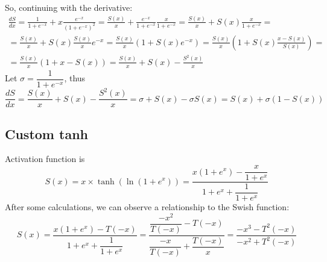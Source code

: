 So, continuing with the derivative:
\[
\begin{gathered}
\frac{dS}{dx} = \frac{1}{1+e^{-x}} + x \frac{e^{-x}}{\left( 1 + e^{-x} \right)^2} = \frac{S(x)}{x} + \frac{e^{-x}}{1+e^{-x}} \frac{x}{1+e^{-x}} = \frac{S(x)}{x} + S(x) \frac{x}{1+e^{-x}} = \\ 
= \frac{S(x)}{x} + S(x) \frac{S(x)}{x} e^{-x} = \frac{S(x)}{x} \left( 1 + S(x) e^{-x} \right) = \frac{S(x)}{x} \left( 1 + S(x)\frac{x-S(x)}{S(x)} \right) = \\
= \frac{S(x)}{x} \left( 1 + x - S(x) \right) = \frac{S(x)}{x} + S(x) - \frac{S^2(x)}{x}
\end{gathered}
\]
Let $\sigma = \dfrac{1}{1 + e^{-x}}$, thus 
\begin{equation}
\frac{dS}{dx} = \frac{S(x)}{x} + S(x) - \frac{S^2(x)}{x} = \sigma + S(x) - \sigma S(x) = S(x) + \sigma \left( 1 - S(x) \right)
\end{equation}

\subsection{Custom tanh}

Activation function is
\[
S(x) = x \times \tanh\left( \ln \left( 1 + e^x\right) \right) = \dfrac{x \left( 1+e^x \right) - \dfrac{x}{1+e^x}}{1+e^x + \dfrac{1}{1+e^x}}
\]
After some calculations, we can observe a relationship to the Swish function:
\[
S(x) = \dfrac{x \left( 1+e^x \right) - T(-x)}{1+e^x + \dfrac{1}{1+e^x}} = \dfrac{\dfrac{-x^2}{T(-x)} - T(-x)}{\dfrac{-x}{T(-x)} + \dfrac{T(-x)}{x}} = \frac{-x^3 - T^2(-x)}{-x^2 + T^2(-x)}
\]
